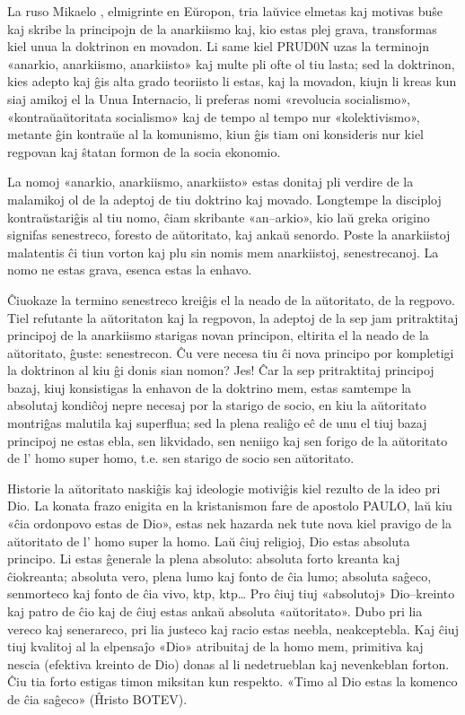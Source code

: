 La ruso Mikaelo , elmigrinte en Eŭropon, tria laŭvice elmetas kaj motivas buŝe kaj skribe la principojn de la anarkiismo kaj, kio estas plej grava, transformas kiel unua la doktrinon en movadon. Li same kiel PRUD0N uzas la terminojn «anarkio, anarkiismo, anarkiisto» kaj multe pli ofte ol tiu lasta; sed la doktrinon, kies adepto kaj ĝis alta grado teoriisto li estas, kaj la movadon, kiujn li kreas kun siaj amikoj el la Unua Internacio, li preferas nomi «revolucia socialismo», «kontraŭaŭtoritata socialismo» kaj de tempo al tempo nur «kolektivismo», metante ĝin kontraŭe al la komunismo, kiun ĝis tiam oni konsideris nur kiel regpovan kaj ŝtatan formon de la socia ekonomio.

La nomoj «anarkio, anarkiismo, anarkiisto» estas donitaj pli verdire de la malamikoj ol de la adeptoj de tiu doktrino kaj movado. Longtempe la disciploj kontraŭstariĝis al tiu nomo, ĉiam skribante «an–arkio», kio laŭ greka origino signifas senestreco, foresto de aŭtoritato, kaj ankaŭ senordo. Poste la anarkiistoj malatentis ĉi tiun vorton kaj plu sin nomis mem anarkiistoj, senestrecanoj. La nomo ne estas grava, esenca estas la enhavo.

Ĉiuokaze la termino senestreco kreiĝis el la neado de la aŭtoritato, de la regpovo. Tiel refutante la aŭtoritaton kaj la regpovon, la adeptoj de la sep jam pritraktitaj principoj de la anarkiismo starigas novan principon, eltirita el la neado de la aŭtoritato, ĝuste: senestrecon. Ĉu vere necesa tiu ĉi nova principo por kompletigi la doktrinon al kiu ĝi donis sian nomon? Jes! Ĉar la sep pritraktitaj principoj bazaj, kiuj konsistigas la enhavon de la doktrino mem, estas samtempe la absolutaj kondiĉoj nepre necesaj por la starigo de socio, en kiu la aŭtoritato montriĝas malutila kaj superflua; sed la plena realiĝo eĉ de unu el tiuj bazaj principoj ne estas ebla, sen likvidado, sen neniigo kaj sen forigo de la aŭtoritato de l’ homo super homo, t.e. sen starigo de socio sen aŭtoritato.

Historie la aŭtoritato naskiĝis kaj ideologie motiviĝis kiel rezulto de la ideo pri Dio. La konata frazo enigita en la kristanismon fare de apostolo PAULO, laŭ kiu «ĉia ordonpovo estas de Dio», estas nek hazarda nek tute nova kiel pravigo de la aŭtoritato de l’ homo super la homo. Laŭ ĉiuj religioj, Dio estas absoluta principo. Li estas ĝenerale la plena absoluto: absoluta forto kreanta kaj ĉiokreanta; absoluta vero, plena lumo kaj fonto de ĉia lumo; absoluta saĝeco, senmorteco kaj fonto de ĉia vivo, ktp, ktp… Pro ĉiuj tiuj «absolutoj» Dio–kreinto kaj patro de ĉio kaj de ĉiuj estas ankaŭ absoluta «aŭtoritato». Dubo pri lia vereco kaj senerareco, pri lia justeco kaj racio estas neebla, neakceptebla. Kaj ĉiuj tiuj kvalitoj al la elpensaĵo «Dio» atribuitaj de la homo mem, primitiva kaj nescia (efektiva kreinto de Dio) donas al li nedetrueblan kaj nevenkeblan forton. Ĉiu tia forto estigas timon miksitan kun respekto. «Timo al Dio estas la komenco de ĉia saĝeco» (Ĥristo BOTEV).

